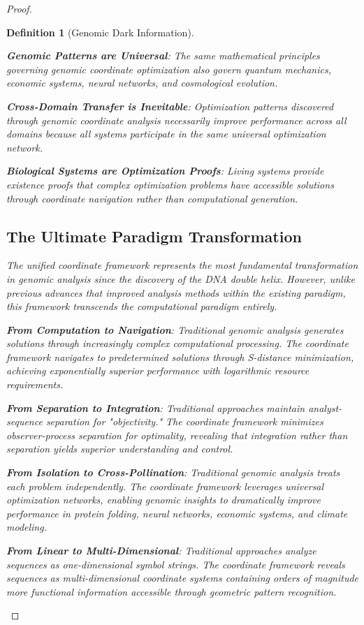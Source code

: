 \documentclass[12pt,a4paper]{article}
\newtheorem{definition}{Definition}
\begin{document}
\begin{proof}
\begin{definition}[Genomic Dark Information]
\begin{algorithm}[H]
\textbf{Genomic Patterns are Universal}: The same mathematical principles governing genomic coordinate optimization also govern quantum mechanics, economic systems, neural networks, and cosmological evolution.

\textbf{Cross-Domain Transfer is Inevitable}: Optimization patterns discovered through genomic coordinate analysis necessarily improve performance across all domains because all systems participate in the same universal optimization network.

\textbf{Biological Systems are Optimization Proofs}: Living systems provide existence proofs that complex optimization problems have accessible solutions through coordinate navigation rather than computational generation.

\subsection{The Ultimate Paradigm Transformation}

The unified coordinate framework represents the most fundamental transformation in genomic analysis since the discovery of the DNA double helix. However, unlike previous advances that improved analysis methods within the existing paradigm, this framework transcends the computational paradigm entirely.

\textbf{From Computation to Navigation}:
Traditional genomic analysis generates solutions through increasingly complex computational processing. The coordinate framework navigates to predetermined solutions through S-distance minimization, achieving exponentially superior performance with logarithmic resource requirements.

\textbf{From Separation to Integration}:
Traditional approaches maintain analyst-sequence separation for "objectivity." The coordinate framework minimizes observer-process separation for optimality, revealing that integration rather than separation yields superior understanding and control.

\textbf{From Isolation to Cross-Pollination}:
Traditional genomic analysis treats each problem independently. The coordinate framework leverages universal optimization networks, enabling genomic insights to dramatically improve performance in protein folding, neural networks, economic systems, and climate modeling.

\textbf{From Linear to Multi-Dimensional}:
Traditional approaches analyze sequences as one-dimensional symbol strings. The coordinate framework reveals sequences as multi-dimensional coordinate systems containing orders of magnitude more functional information accessible through geometric pattern recognition.


\end{algorithm}
\end{definition}
\end{proof}
\end{document}
